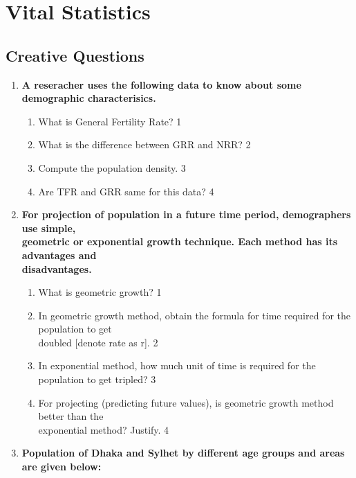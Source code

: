 \documentclass[a4paper,oneside, margin=1.4in]{book}
\begin{document}
\chapter{Vital Statistics} 
\section{Creative Questions}

  \begin{enumerate}
  
   \item
	  \textbf{A reseracher uses the following data to know about some demographic characterisics.} 
  
  \begin{enumerate}
    \item
	What is General Fertility Rate? \hfill 1
    \item
	What is the difference between GRR and NRR? \hfill 2
    \item  
	Compute the population density. \hfill 3
    \item
	Are TFR and GRR same for this data? \hfill 4
  \end{enumerate}
  
 \item
  \textbf{For projection of population in a future time period, demographers use simple, \\ geometric or exponential growth technique. Each method has its advantages and \\ disadvantages.}

  \begin{enumerate}
    \item
	What is geometric growth? \hfill 1
    \item
    	In geometric growth method, obtain the formula for time required for the population to get \\ doubled [denote rate as r]. \hfill 2
    \item
    	In exponential method, how much unit of time is required for the population to get tripled?  \hfill 3
     \item
     	For projecting (predicting future values), is geometric growth method better than the \\ exponential method? Justify.  \hfill 4
  \end{enumerate}
  
     \item
	  \textbf{Population of Dhaka and Sylhet by different age groups and areas are given below:} 
	  

\end{enumerate}
\end{document}

